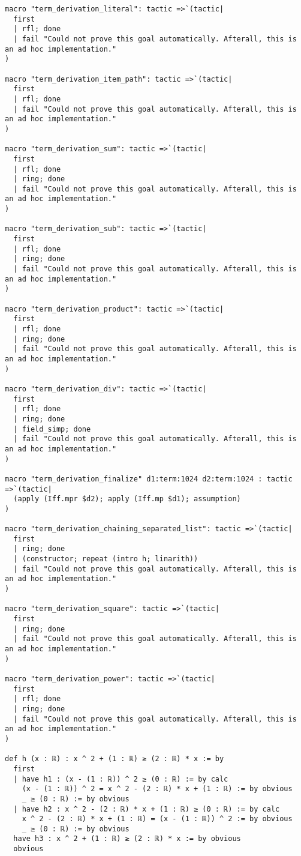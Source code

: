 \documentclass{article}
\begin{document}
\begin{tcolorbox}[colback=white!10, width=\linewidth]
\begin{lstlisting}[language=Lean4]
macro "term_derivation_literal": tactic =>`(tactic|
  first
  | rfl; done
  | fail "Could not prove this goal automatically. Afterall, this is an ad hoc implementation."
)

macro "term_derivation_item_path": tactic =>`(tactic|
  first
  | rfl; done
  | fail "Could not prove this goal automatically. Afterall, this is an ad hoc implementation."
)

macro "term_derivation_sum": tactic =>`(tactic|
  first
  | rfl; done
  | ring; done
  | fail "Could not prove this goal automatically. Afterall, this is an ad hoc implementation."
)

macro "term_derivation_sub": tactic =>`(tactic|
  first
  | rfl; done
  | ring; done
  | fail "Could not prove this goal automatically. Afterall, this is an ad hoc implementation."
)

macro "term_derivation_product": tactic =>`(tactic|
  first
  | rfl; done
  | ring; done
  | fail "Could not prove this goal automatically. Afterall, this is an ad hoc implementation."
)

macro "term_derivation_div": tactic =>`(tactic|
  first
  | rfl; done
  | ring; done
  | field_simp; done
  | fail "Could not prove this goal automatically. Afterall, this is an ad hoc implementation."
)

macro "term_derivation_finalize" d1:term:1024 d2:term:1024 : tactic =>`(tactic|
  (apply (Iff.mpr $d2); apply (Iff.mp $d1); assumption)
)

macro "term_derivation_chaining_separated_list": tactic =>`(tactic|
  first
  | ring; done
  | (constructor; repeat (intro h; linarith))
  | fail "Could not prove this goal automatically. Afterall, this is an ad hoc implementation."
)

macro "term_derivation_square": tactic =>`(tactic|
  first
  | ring; done
  | fail "Could not prove this goal automatically. Afterall, this is an ad hoc implementation."
)

macro "term_derivation_power": tactic =>`(tactic|
  first
  | rfl; done
  | ring; done
  | fail "Could not prove this goal automatically. Afterall, this is an ad hoc implementation."
)

def h (x : ℝ) : x ^ 2 + (1 : ℝ) ≥ (2 : ℝ) * x := by
  first
  | have h1 : (x - (1 : ℝ)) ^ 2 ≥ (0 : ℝ) := by calc
    (x - (1 : ℝ)) ^ 2 = x ^ 2 - (2 : ℝ) * x + (1 : ℝ) := by obvious
    _ ≥ (0 : ℝ) := by obvious
  | have h2 : x ^ 2 - (2 : ℝ) * x + (1 : ℝ) ≥ (0 : ℝ) := by calc
    x ^ 2 - (2 : ℝ) * x + (1 : ℝ) = (x - (1 : ℝ)) ^ 2 := by obvious
    _ ≥ (0 : ℝ) := by obvious
  have h3 : x ^ 2 + (1 : ℝ) ≥ (2 : ℝ) * x := by obvious
  obvious

\end{lstlisting}
\end{tcolorbox}
\end{document}
